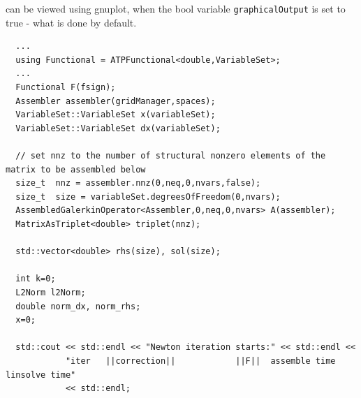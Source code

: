 \documentclass[11pt]{article}
\begin{document}
can be viewed using gnuplot, when the bool variable {\tt graphicalOutput} is set to true - what is done by 
default.
\begin{lstlisting}
  ...
  using Functional = ATPFunctional<double,VariableSet>;
  ...
  Functional F(fsign);
  Assembler assembler(gridManager,spaces);
  VariableSet::VariableSet x(variableSet);
  VariableSet::VariableSet dx(variableSet);

  // set nnz to the number of structural nonzero elements of the matrix to be assembled below
  size_t  nnz = assembler.nnz(0,neq,0,nvars,false);
  size_t  size = variableSet.degreesOfFreedom(0,nvars);
  AssembledGalerkinOperator<Assembler,0,neq,0,nvars> A(assembler);
  MatrixAsTriplet<double> triplet(nnz);
      
  std::vector<double> rhs(size), sol(size);
  
  int k=0;
  L2Norm l2Norm;
  double norm_dx, norm_rhs;
  x=0;
  
  std::cout << std::endl << "Newton iteration starts:" << std::endl <<
            "iter   ||correction||            ||F||  assemble time  linsolve time"
            << std::endl;


\end{lstlisting}
\end{document}
